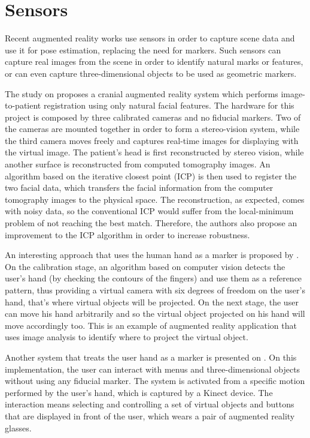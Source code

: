 \documentclass[msc, a4paper, classic, en]{ufbathesis}
\begin{document}
\section{Sensors}

Recent augmented reality works use sensors in order to capture scene data and use it for pose estimation, replacing the need for markers. Such sensors can capture real images from the scene in order to identify natural marks or features, or can even capture three-dimensional objects to be used as geometric markers.

The study on \cite{Lee20125286} proposes a cranial augmented reality system which performs image-to-patient registration using only natural facial features. The hardware for this project is composed by three calibrated cameras and no fiducial markers. Two of the cameras are mounted together in order to form a stereo-vision system, while the third camera moves freely and captures real-time images for displaying with the virtual image. The patient's head is first reconstructed by stereo vision, while another surface is reconstructed from computed tomography images. An algorithm based on the iterative closest point (ICP) is then used to register the two facial data, which transfers the facial information from the computer tomography images to the physical space. The reconstruction, as expected, comes with noisy data, so the conventional ICP would suffer from the local-minimum problem of not reaching the best match. Therefore, the authors also propose an improvement to the ICP algorithm in order to increase robustness.

An interesting approach that uses the human hand as a marker is proposed by \cite{4373785}. On the calibration stage, an algorithm based on computer vision detects the user's hand (by checking the contours of the fingers) and use them as a reference pattern, thus providing a virtual camera with six degrees of freedom on the user's hand, that's where virtual objects will be projected. On the next stage, the user can move his hand arbitrarily and so the virtual object projected on his hand will move accordingly too. This is an example of augmented reality application that uses image analysis to identify where to project the virtual object.

Another system that treats the user hand as a marker is presented on \cite{51078809}. On this implementation, the user can interact with menus and three-dimensional objects without using any fiducial marker. The system is activated from a specific motion performed by the user's hand, which is captured by a Kinect device. The interaction means selecting and controlling a set of virtual objects and buttons that are displayed in front of the user, which wears a pair of augmented reality glasses. 
\end{document}
